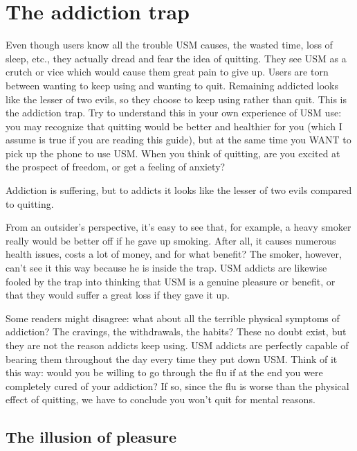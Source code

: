\documentclass[
  openany]{book}
\newenvironment{rmdnote}{
\color{blue}
\begin{framed}}{\end{framed}}
\begin{document}
\chapter{The addiction trap}\label{the-trap}

Even though users know all the trouble USM causes, the wasted time, loss of sleep, etc., they actually dread and fear the idea of quitting. They see USM as a crutch or vice which would cause them great pain to give up. Users are torn between wanting to keep using and wanting to quit. Remaining addicted looks like the lesser of two evils, so they choose to keep using rather than quit. This is the addiction trap. Try to understand this in your own experience of USM use: you may recognize that quitting would be better and healthier for you (which I assume is true if you are reading this guide), but at the same time you WANT to pick up the phone to use USM. When you think of quitting, are you excited at the prospect of freedom, or get a feeling of anxiety?

\begin{rmdnote}
Addiction is suffering, but to addicts it looks like the lesser of two evils compared to quitting.

\end{rmdnote}

From an outsider's perspective, it's easy to see that, for example, a heavy smoker really would be better off if he gave up smoking. After all, it causes numerous health issues, costs a lot of money, and for what benefit? The smoker, however, can't see it this way because he is inside the trap. USM addicts are likewise fooled by the trap into thinking that USM is a genuine pleasure or benefit, or that they would suffer a great loss if they gave it up.

Some readers might disagree: what about all the terrible physical symptoms of addiction? The cravings, the withdrawals, the habits? These no doubt exist, but they are not the reason addicts keep using. USM addicts are perfectly capable of bearing them throughout the day every time they put down USM. Think of it this way: would you be willing to go through the flu if at the end you were completely cured of your addiction? If so, since the flu is worse than the physical effect of quitting, we have to conclude you won't quit for mental reasons.

\section{The illusion of pleasure}\label{the-illusion-of-pleasure}
\end{document}
